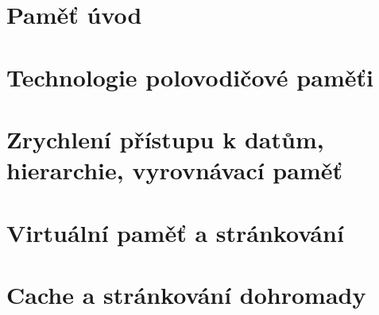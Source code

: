 \documentclass{beamer}
\subtitle{Lekce 04. Hierarchie paměti}
\author{Pavel Píša \phantom{xxxxxxx} Petr Štěpán \\ \small\texttt{pisa@fel.cvut.cz}\phantom{xxxx}\small\texttt{stepan@fel.cvut.cz}}
\begin{document}
\maketitle

\section{Paměť úvod}



\section{Technologie polovodičové paměťi}







\section{Zrychlení přístupu k datům, hierarchie, vyrovnávací paměť}









\section{Virtuální paměť a stránkování}



\section{Cache a stránkování dohromady}


\end{document}
